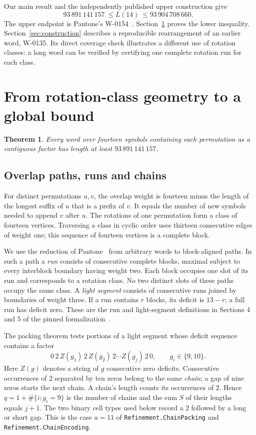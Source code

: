 \documentclass[11pt]{article}
\newtheorem{theorem}{Theorem}[section]
\begin{document}
Our main result and the independently published upper construction give
\[
     93\,891\,141\,157\ \le L(14)\ \le 93\,904\,708\,660 .
\]
The upper endpoint is Pantone's W-0154~\cite{w154}. Section~\ref{sec:lower} proves the lower inequality. Section~\ref{sec:construction} describes a reproducible rearrangement of an earlier word, W-0135. Its direct coverage check illustrates a different use of rotation classes: a long word can be verified by certifying one complete rotation run for each class.
\section{From rotation-class geometry to a global bound}
\label{sec:lower}

\begin{theorem}\label{thm:fourteen-lower}
Every word over fourteen symbols containing each permutation as a contiguous factor has length at least $93\,891\,141\,157$.
\end{theorem}

\subsection{Overlap paths, runs and chains}
For distinct permutations $u,v$, the overlap weight is fourteen minus the length of the longest suffix of $u$ that is a prefix of $v$. It equals the number of new symbols needed to append $v$ after $u$. The rotations of one permutation form a class of fourteen vertices. Traversing a class in cyclic order uses thirteen consecutive edges of weight one; this sequence of fourteen vertices is a complete block.

We use the reduction of Pantone~\cite{pantone} from arbitrary words to block-aligned paths. In such a path a \emph{run} consists of consecutive complete blocks, maximal subject to every interblock boundary having weight two. Each block occupies one slot of its run and corresponds to a rotation class. No two distinct slots of these paths occupy the same class. A \emph{light segment} consists of consecutive runs joined by boundaries of weight three. If a run contains $r$ blocks, its deficit is $13-r$; a full run has deficit zero. These are the run and light-segment definitions in Sections 4 and 5 of the pinned formalization~\cite{pantone}.

The packing theorem tests portions of a light segment whose deficit sequence contains a factor
\[
   0\,2\,Z(g_1)\,2\,Z(g_2)\,2\cdots Z(g_j)\,2\,0,
   \qquad  g_i\in\{9,10\}.
\]
Here $Z(g)$ denotes a string of $g$ consecutive zero deficits. Consecutive occurrences of $2$ separated by ten zeros belong to the same \emph{chain}; a gap of nine zeros starts the next chain. A chain's length counts its occurrences of $2$. Hence $q=1+\#\{i:g_i=9\}$ is the number of chains and the sum $S$ of their lengths equals $j+1$. The two binary cell types used below record a $2$ followed by a long or short gap. This is the case $a=11$ of \texttt{Refinement.ChainPacking} and \texttt{Refinement.ChainEncoding}.
\end{document}
